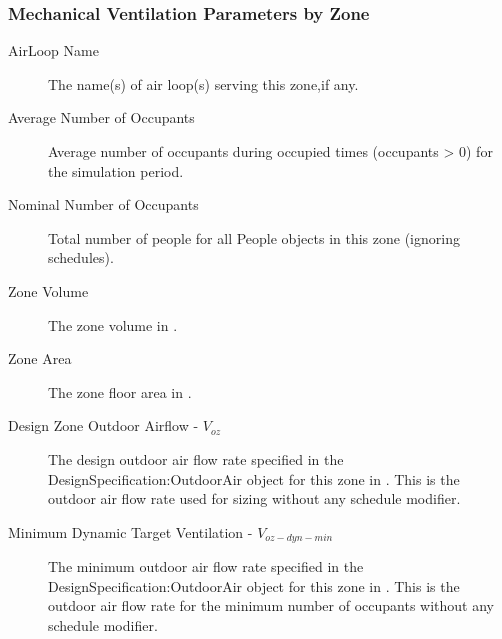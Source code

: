 \subsubsection{Mechanical Ventilation Parameters by Zone}\label{mechanical-ventilation-parameters-by-zone}
\begin{description}
  \item[AirLoop Name] The name(s) of air loop(s) serving this zone,if any.
  \item[Average Number of Occupants] Average number of occupants during occupied times (occupants > 0) for the simulation period.
  \item[Nominal Number of Occupants] Total number of people for all People objects in this zone (ignoring schedules).
  \item[Zone Volume] The zone volume in \si{\volume}.
  \item[Zone Area] The zone floor area in \si{\area}.
  \item[Design Zone Outdoor Airflow - \(V_{oz}\)] The design outdoor air flow rate specified in the DesignSpecification:OutdoorAir object for this zone in \si{\volumeFlowRate}. This is the outdoor air flow rate used for sizing without any schedule modifier.
  \item[Minimum Dynamic Target Ventilation - \(V_{oz-dyn-min}\)] The minimum outdoor air flow rate specified in the DesignSpecification:OutdoorAir object for this zone in \si{\volumeFlowRate}. This is the outdoor air flow rate for the minimum number of occupants without any schedule modifier.
\end{description}

